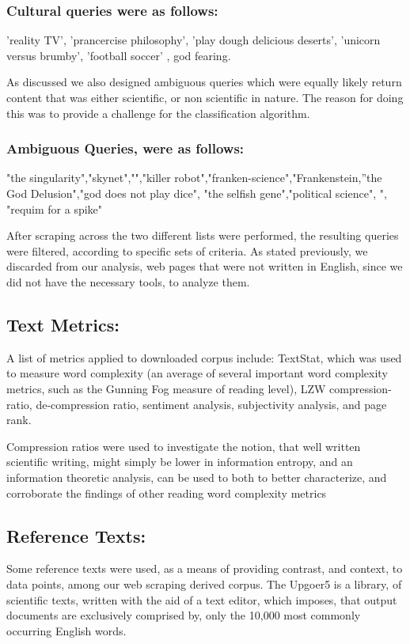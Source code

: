 \documentclass{clv3}
\begin{document}
\subsubsection{Cultural queries were as follows:} 'reality TV', 'prancercise philosophy', 'play dough delicious deserts', 'unicorn versus brumby', 'football soccer' , god fearing.

As discussed we also designed ambiguous queries which were equally likely return content that was either scientific, or non scientific in nature. The reason for doing this was to provide a challenge for the classification algorithm.

\subsubsection{Ambiguous Queries, were as follows:}

"the singularity","skynet","","killer robot","franken-science","Frankenstein,”the God Delusion","god does not play dice", "the selfish gene","political science", ", "requim for a spike"


After scraping across the two different lists were performed, the resulting queries were filtered, according to specific sets of criteria. As stated previously, we discarded from our analysis, web pages that were not written in English, since we did not have the necessary tools, to analyze them.

\subsection{Text Metrics:}
A list of metrics applied to downloaded corpus include: TextStat, which was used to measure word complexity (an average of several important word complexity metrics, such as the Gunning Fog measure of reading level), LZW compression-ratio, de-compression ratio, sentiment analysis, subjectivity analysis, and page rank.

Compression ratios were used to investigate the notion, that well written scientific writing, might simply be lower in information entropy, and an information theoretic analysis, can be used to both to better characterize, and corroborate the findings of other reading word complexity metrics

\subsection{Reference Texts:}

Some reference texts were used, as a means of providing contrast, and context, to data points, among our web scraping derived corpus. The Upgoer5 is a library, of scientific texts, written with the aid of a text editor, which imposes, that output documents are exclusively comprised by, only the 10,000 most commonly occurring English words.
\end{document}
